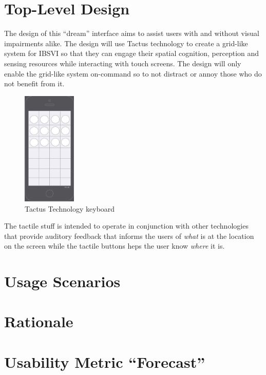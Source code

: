 \documentclass[11pt]{article}
\begin{document}
\section{Top-Level Design}
The design of this ``dream'' interface aims to assist users with and without visual impairments alike. The design will use Tactus technology to create a grid-like system for IBSVI so that they can engage their spatial cognition, perception and sensing resources while interacting with touch screens. The design will only enable the grid-like system on-command so to not distract or annoy those who do not benefit from it.


\begin{figure}[ht]
\centering
\includegraphics[width=1in]{wireframe.png} 
\caption{Tactus Technology keyboard}
\label{tactus}
\end{figure}

The tactile stuff is intended to operate in conjunction with other technologies that provide auditory feedback that informs the users of \textit{what} is at the location on the screen while the tactile buttons heps the user know \textit{where} it is. 
\label{background}

\section{Usage Scenarios}

\section{Rationale}


\section{Usability Metric ``Forecast''}
\clearpage


{}

\end{document}

